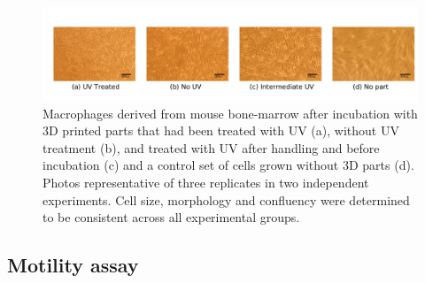 \begin{refsection}
\begin{figure}
    \centering
    

    \includegraphics[width=1.0\textwidth]{sterility/figures/Fig3}

    \caption{ Macrophages derived from mouse bone-marrow after
      incubation with 3D printed parts that had been treated with UV
      (a), without UV treatment (b), and treated with UV after
      handling and before incubation (c) and a control set of cells
      grown without 3D parts (d). Photos representative of three
      replicates in two independent experiments. Cell size, morphology
      and confluency were determined to be consistent across all
      experimental groups.}
    
    \label{fig:mousecells}
\end{figure}


\subsection{Motility assay}


\end{refsection}
